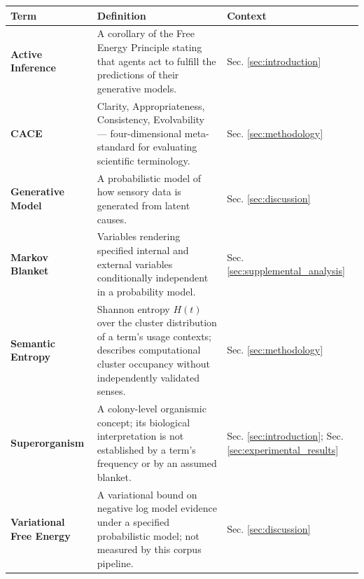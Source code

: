 \documentclass[
]{article}
\newcounter{none} %
\numberwithin{equation}{section}
\begin{document}
{\def\LTcaptype{none} %
\begin{longtable}[]{@{}
  >{\raggedright\arraybackslash}p{}
  >{\raggedright\arraybackslash}p{}
  >{\raggedright\arraybackslash}p{}@{}}
\toprule\noalign{}
\begin{minipage}[b]{\linewidth}\raggedright
Term
\end{minipage} & \begin{minipage}[b]{\linewidth}\raggedright
Definition
\end{minipage} & \begin{minipage}[b]{\linewidth}\raggedright
Context
\end{minipage} \\
\midrule\noalign{}
\endhead
\bottomrule\noalign{}
\endlastfoot
\textbf{Active Inference} & A corollary of the Free Energy Principle
stating that agents act to fulfill the predictions of their generative
models. & Sec. \ref{sec:introduction} \\
\textbf{CACE} & Clarity, Appropriateness, Consistency, Evolvability ---
four-dimensional meta-standard for evaluating scientific terminology. &
Sec. \ref{sec:methodology} \\
\textbf{Generative Model} & A probabilistic model of how sensory data is
generated from latent causes. & Sec. \ref{sec:discussion} \\
\textbf{Markov Blanket} & Variables rendering specified internal and
external variables conditionally independent in a probability model. &
Sec. \ref{sec:supplemental_analysis} \\
\textbf{Semantic Entropy} & Shannon entropy \(H(t)\) over the cluster
distribution of a term's usage contexts; describes computational cluster
occupancy without independently validated senses. & Sec.
\ref{sec:methodology} \\
\textbf{Superorganism} & A colony-level organismic concept; its
biological interpretation is not established by a term's frequency or by
an assumed blanket. & Sec. \ref{sec:introduction}; Sec.
\ref{sec:experimental_results} \\
\textbf{Variational Free Energy} & A variational bound on negative log
model evidence under a specified probabilistic model; not measured by
this corpus pipeline. & Sec. \ref{sec:discussion} \\
\end{longtable}
}
\end{document}
